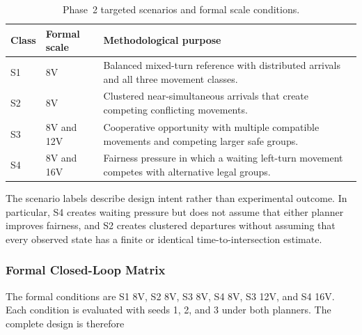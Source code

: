 \documentclass[letterpaper,10pt,conference]{ieeeconf}
\begin{document}
\begin{table}[t]

\centering

\caption{Phase~2 targeted scenarios and formal scale conditions.}

\label{tab:phase2_scenarios}

\renewcommand{\arraystretch}{1.08}

\begin{tabular}{p{1.1cm} p{4.3cm} p{8.0cm}}

\toprule

\textbf{Class} & \textbf{Formal scale} & \textbf{Methodological purpose} \\

\midrule

S1 & 8V & Balanced mixed-turn reference with distributed arrivals and all three movement classes. \\

S2 & 8V & Clustered near-simultaneous arrivals that create competing conflicting movements. \\

S3 & 8V and 12V & Cooperative opportunity with multiple compatible movements and competing larger safe groups. \\

S4 & 8V and 16V & Fairness pressure in which a waiting left-turn movement competes with alternative legal groups. \\

\bottomrule

\end{tabular}

\end{table}



The scenario labels describe design intent rather than experimental outcome. In particular, S4 creates waiting pressure but does not assume that either planner improves fairness, and S2 creates clustered departures without assuming that every observed state has a finite or identical time-to-intersection estimate.



\subsubsection{Formal Closed-Loop Matrix}



The formal conditions are S1 8V, S2 8V, S3 8V, S4 8V, S3 12V, and S4 16V. Each condition is evaluated with seeds 1, 2, and 3 under both planners. The complete design is therefore
\end{document}
